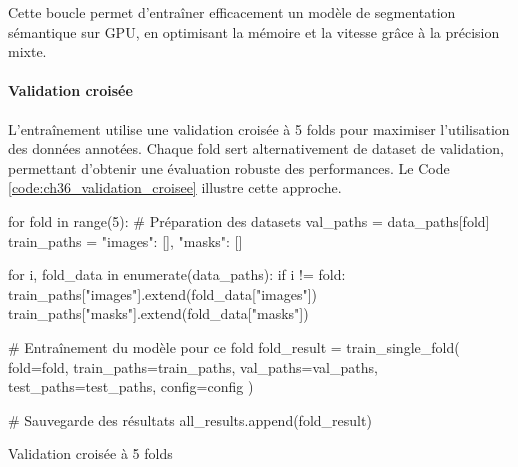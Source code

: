 Cette boucle permet d'entraîner efficacement un modèle de segmentation sémantique sur GPU, en optimisant la mémoire et la vitesse grâce à la précision mixte.

\paragraph{Validation croisée}
L'entraînement utilise une validation croisée à 5 folds pour maximiser l'utilisation des données annotées. Chaque fold sert alternativement de dataset de validation, permettant d'obtenir une évaluation robuste des performances. Le Code \ref{code:ch36_validation_croisee} illustre cette approche.

\begin{code}[H]
    \begin{pythoncode}
    for fold in range(5):
        # Préparation des datasets
        val_paths = data_paths[fold]
        train_paths = {"images": [], "masks": []}
        
        for i, fold_data in enumerate(data_paths):
            if i != fold:
                train_paths["images"].extend(fold_data["images"])
                train_paths["masks"].extend(fold_data["masks"])
        
        # Entraînement du modèle pour ce fold
        fold_result = train_single_fold(
            fold=fold,
            train_paths=train_paths,
            val_paths=val_paths,
            test_paths=test_paths,
            config=config
        )
        
        # Sauvegarde des résultats
        all_results.append(fold_result)
    \end{pythoncode}
    \caption{Validation croisée à 5 folds}
    \label{code:ch36_validation_croisee}
\end{code}

